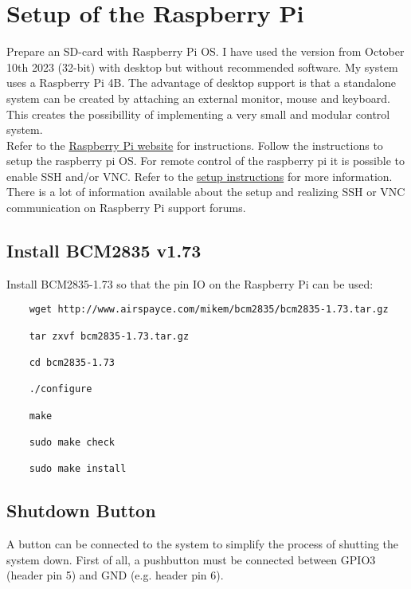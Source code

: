\section{Setup of the Raspberry Pi}
Prepare an SD-card with Raspberry Pi OS. I have used the version from October 10th 2023 (32-bit) with desktop but without recommended software. My system uses a Raspberry Pi 4B. The advantage of desktop support is that a standalone system can be created by attaching an external monitor, mouse and keyboard. This creates the possibillity of implementing a very small and modular control system.\\

Refer to the \href{https://projects.raspberrypi.org/en/projects/raspberry-pi-setting-up/2}{Raspberry Pi website} for instructions. Follow the instructions to setup the raspberry pi OS. For remote control of the raspberry pi it is possible to enable SSH and/or VNC. Refer to the \href{https://projects.raspberrypi.org/en/projects/raspberry-pi-setting-up/4}{setup instructions} for more information. There is a lot of information available about the setup and realizing SSH or VNC communication on Raspberry Pi support forums.

\subsection{Install BCM2835 v1.73}
Install BCM2835-1.73 so that the pin IO on the Raspberry Pi can be used:
\begin{verbatim}
	wget http://www.airspayce.com/mikem/bcm2835/bcm2835-1.73.tar.gz 
	
	tar zxvf bcm2835-1.73.tar.gz
	
	cd bcm2835-1.73
	
	./configure
	
	make
	
	sudo make check
	
	sudo make install
\end{verbatim}

\subsection{Shutdown Button}


A button can be connected to the system to simplify the process of shutting the system down. First of all, a pushbutton must be connected between GPIO3 (header pin 5) and GND (e.g. header pin 6). \\

